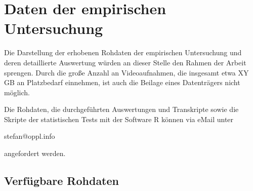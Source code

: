 \chapter{Daten der empirischen Untersuchung} %
\label{cha:daten_der_empirischen_untersuchung}

Die Darstellung der erhobenen Rohdaten der empirischen Untersuchung und deren detaillierte Auswertung würden an dieser Stelle den Rahmen der Arbeit sprengen. Durch die große Anzahl an Videoaufnahmen, die insgesamt etwa XY \gls{GB} an Platzbedarf einnehmen, ist auch die Beilage eines Datenträgers nicht möglich. 

Die Rohdaten, die durchgeführten Auswertungen und Transkripte sowie die Skripte der statistischen Tests mit der Software R können via eMail unter

\begin{center} stefan@oppl.info \end{center}

angefordert werden. 

\section{Verfügbare Rohdaten} %
\label{sec:verfügbare_rohdaten}


